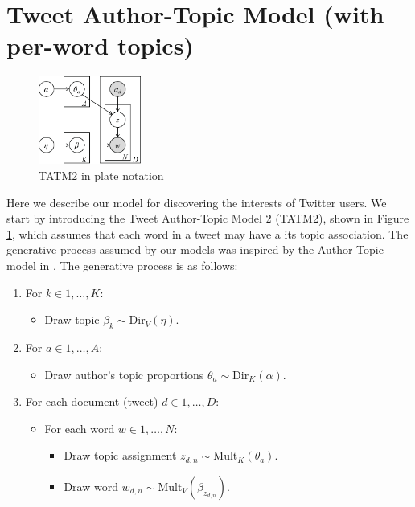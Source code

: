 \section{Tweet Author-Topic Model (with per-word topics)}

\begin{figure}[tb]
    \centering
    \includegraphics[width=0.3\textwidth]{TATM2.eps}
    \caption{TATM2 in plate notation}
    \label{fig:TATM2}
\end{figure}

Here we describe our model for discovering the interests of Twitter users. We start by introducing the Tweet Author-Topic Model 2 (TATM2), shown in Figure \ref{fig:TATM2}, which assumes that each word in a tweet may have a its topic association. The generative process assumed by our models was inspired by the Author-Topic model in \cite{Rosen04}. The generative process is as follows:

\begin{enumerate}
	\item For $k \in {1, \ldots, K}$:
	\begin{itemize}
		\item Draw topic $\beta_k \sim \text{Dir}_V(\eta)$.
	\end{itemize}
	\item For $a \in {1, \ldots, A}$:
	\begin{itemize}
		\item Draw author's topic proportions $\theta_a \sim \text{Dir}_K(\alpha)$.
	\end{itemize}
  \item For each document (tweet) $d \in {1, \ldots, D}$:
	\begin{itemize}
		\item For each word $w \in {1, \ldots, N}$:
		\begin{itemize}
			\item Draw topic assignment $z_{d,n} \sim \text{Mult}_K(\theta_a)$.
			\item Draw word $w_{d,n} \sim \text{Mult}_V(\beta_{z_{d,n}})$.
		\end{itemize}
	\end{itemize}
\end{enumerate}


